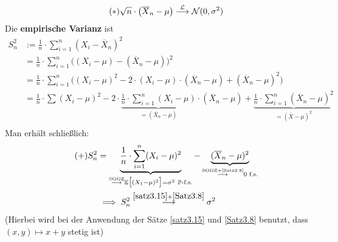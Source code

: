 \begin{align}\label{eqAnwendungInDerStatistikStern}\tag{$\ast$}
	\sqrt{n}\cdot\big(\overline{X}_n-\mu\big)\stackrel{\mathcal{L}}{\longrightarrow}\mathcal{N}(0,\sigma^2)
\end{align}
Die \textbf{empirische Varianz} ist 
\begin{align*}
	S_n^2&:=\frac{1}{n}\cdot\sum\limits_{i=1}^n(X_i-\overline{X}_n)^2\\
	&=\frac{1}{n}\cdot\sum\limits_{i=1}^n\big((X_i-\mu)-(\overline{X}_n-\mu)\big)^2\\
	&=\frac{1}{n}\cdot\sum\limits_{i=1}^n\Big((X_i-\mu)^2-2\cdot(X_i-\mu)\cdot(\overline{X}_n-\mu)+(\overline{X}_n-\mu)^2\Big)\\
	&=\frac{1}{n}\cdot\sum\limits(X_i-\mu)^2-2\cdot\underbrace{\frac{1}{n}\cdot\sum\limits_{i=1}^n(X_i-\mu)}_{=(\overline{X}_n-\mu)}\cdot(\overline{X}_n-\mu)+\underbrace{\frac{1}{n}\cdot\sum\limits_{i=1}^n(\overline{X}_n-\mu)^2}_{=(\overline{X}-\mu)^2}\\
\end{align*}
Man erhält schließlich:
\begin{align}\label{eqEmpVarAlternativePlus}\tag{+}
	S_n^2&=\underbrace{\frac{1}{n}\cdot\sum\limits_{i=1}^n(X_i-\mu)^2}_{\stackrel{\text{SGGZ}}{\longrightarrow}\mathbb{E}\big[(X_1-\mu)^2\big]=\sigma^2~\mathbb{P}\text{-f.s.}}-\underbrace{(\overline{X}_n-\mu)^2}_{\stackrel{\text{SGGZ+\ref{Satz3.8}}}{\longrightarrow}0\text{ f.s.}}\\\nonumber
	&\implies
	S_n^2\stackrel{\ref{satz3.15}+\ref{Satz3.8}}{\longrightarrow}\sigma^2
\end{align}
(Hierbei wird bei der Anwendung der Sätze \ref{satz3.15} und \ref{Satz3.8} benutzt, dass $(x,y)\mapsto x+y$ stetig ist)

